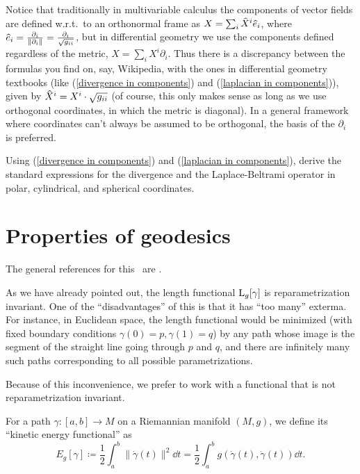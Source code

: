 \begin{rem}
    Notice that traditionally in multivariable calculus the components of vector fields are defined w.r.t.\ to an orthonormal frame as $X=\sum_i \wh{X}^i \wh{e}_i$, where $\wh{e}_i=\frac{\partial_i}{\lVert \partial_i\lVert}=\frac{\partial_i}{\sqrt{g_{ii}}}$, but in differential geometry we use the components defined regardless of the metric, $X=\sum_i X^i \partial_i$. Thus there is a discrepancy between the formulas you find on, say, Wikipedia, with the ones in differential geometry textbooks (like (\ref{divergence in components}) and (\ref{laplacian in components})), given by $\wh{X}^i=X^i\cdot \sqrt{g_{ii}}$ (of course, this only makes sense as long as we use orthogonal coordinates, in which the metric is diagonal). In a general framework where coordinates can't always be assumed to be orthogonal, the basis of the $\partial_i$ is preferred.
\end{rem}

\begin{xca}
    Using (\ref{divergence in components}) and (\ref{laplacian in components}), derive the standard expressions for the divergence and the Laplace-Beltrami operator in polar, cylindrical, and spherical  coordinates. 
\end{xca}




\section{Properties of geodesics}


The general references for this \sect\ are \cite{Jost,Milnor}.

As we have already pointed out, the length functional $\mathrm{L}_g[\gamma]$ is reparametrization invariant. One of the ``disadvantages'' of this is that it has ``too many'' exterma. For instance, in Euclidean space, the length functional would be minimized (with fixed boundary conditions $\gamma(0)=p,\gamma(1)=q$) by any path whose image is the segment of the straight line going through $p$ and $q$, and there are infinitely many such paths corresponding to all possible parametrizations.

Because of this inconvenience, we prefer to work with a functional that is not reparametrization invariant.

\begin{defn}
    For a path $\gamma:[a,b]\to M$ on a Riemannian manifold $(M,g)$, we define its ``kinetic energy functional'' as
    \[E_g[\gamma]\coloneqq \frac12 \int_a^b \lVert \dot\gamma(t)\rVert^2\dd t=\frac12 \int_a^b g(\dot\gamma(t),\dot\gamma(t))\dd t.\]
\end{defn}

